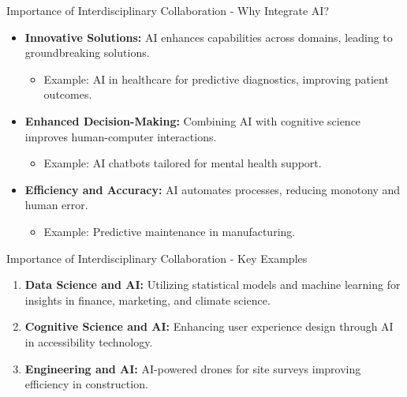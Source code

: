 \documentclass[aspectratio=169]{beamer}
\begin{document}
\begin{frame}[fragile]{Importance of Interdisciplinary Collaboration - Why Integrate AI?}
  \begin{itemize}
    \item \textbf{Innovative Solutions:} 
      AI enhances capabilities across domains, leading to groundbreaking solutions. 
      \begin{itemize}
        \item Example: AI in healthcare for predictive diagnostics, improving patient outcomes.
      \end{itemize}
      
    \item \textbf{Enhanced Decision-Making:} 
      Combining AI with cognitive science improves human-computer interactions. 
      \begin{itemize}
        \item Example: AI chatbots tailored for mental health support.
      \end{itemize}
     
    \item \textbf{Efficiency and Accuracy:} 
      AI automates processes, reducing monotony and human error. 
      \begin{itemize}
        \item Example: Predictive maintenance in manufacturing.
      \end{itemize}
  \end{itemize}
\end{frame}

\begin{frame}[fragile]{Importance of Interdisciplinary Collaboration - Key Examples}
  \begin{enumerate}
    \item \textbf{Data Science and AI:} 
      Utilizing statistical models and machine learning for insights in finance, marketing, and climate science.
      
    \item \textbf{Cognitive Science and AI:} 
      Enhancing user experience design through AI in accessibility technology.
      
    \item \textbf{Engineering and AI:} 
      AI-powered drones for site surveys improving efficiency in construction.
  \end{enumerate}
\end{frame}
\end{document}
